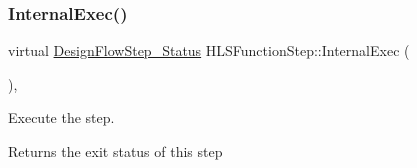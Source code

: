 \subsubsection{\texorpdfstring{Internal\+Exec()}{InternalExec()}}
{\footnotesize\ttfamily virtual \hyperlink{design__flow__step_8hpp_afb1f0d73069c26076b8d31dbc8ebecdf}{Design\+Flow\+Step\+\_\+\+Status} H\+L\+S\+Function\+Step\+::\+Internal\+Exec (\begin{DoxyParamCaption}{ }\end{DoxyParamCaption})\hspace{0.3cm}{\ttfamily [protected]}, {}}



Execute the step. 

\begin{DoxyReturn}{Returns}
the exit status of this step 
\end{DoxyReturn}


